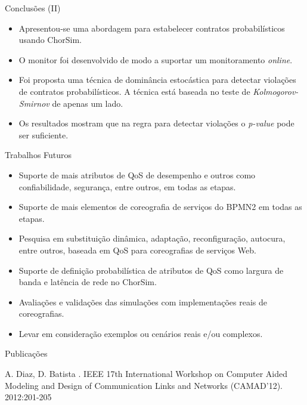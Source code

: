 \documentclass[xcolor=svgnames]{beamer}
\begin{document}
  \begin{frame}{Conclusões (II)}
      \begin{itemize}
	\item Apresentou-se uma abordagem para estabelecer contratos probabilísticos usando ChorSim.
	\item O monitor foi desenvolvido de modo a suportar um monitoramento \textit{online}.
	\item Foi proposta uma técnica de dominância estocástica para detectar violações de contratos probabilísticos. 
	  A técnica está baseada no teste de \textit{Kolmogorov-Smirnov} de apenas um lado.
	\item Os resultados mostram que na regra para detectar violações o \textit{p-value} pode ser suficiente.
      \end{itemize}
  \end{frame}

  \begin{frame}{Trabalhos Futuros}
      \begin{itemize}
	\item Suporte de mais atributos de QoS de desempenho e outros como confiabilidade, segurança, entre outros, em todas as etapas.
	\item Suporte de mais elementos de coreografia de serviços do BPMN2 em todas as etapas.
	\item Pesquisa em  substituição dinâmica, adaptação, reconfiguração, autocura, entre outros,  baseada em QoS para coreografias de serviços Web.
	\item Suporte de definição probabilística de atributos de QoS como largura de banda e latência de rede no ChorSim.
	\item Avaliações e validações das simulações com implementações reais de coreografias.
	\item Levar em consideração exemplos ou cenários reais e/ou complexos.
      \end{itemize}
  \end{frame}
  


  \begin{frame}{Publicações}
      \begin{thebibliography}{1}
        \beamertemplatearticlebibitems
	    A. Diaz, D. Batista
	  .
	  \newblock  IEEE 17th International Workshop on Computer Aided Modeling and Design of Communication Links and Networks (CAMAD'12). 2012:201-205
      \end{thebibliography}
  \end{frame}
\end{document}
